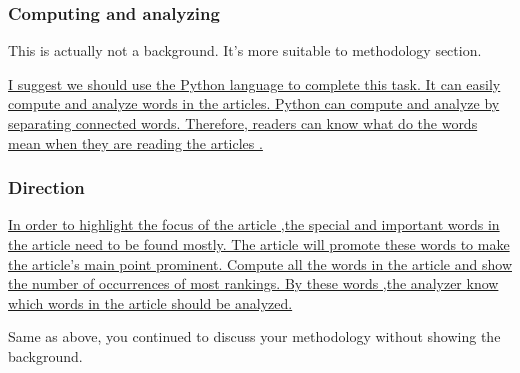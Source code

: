 \subsubsection*{Computing and analyzing}
This is actually not a background. It's more suitable to methodology section.

\ul{I suggest we should use the Python language to complete this task. It can easily compute and analyze words in the articles. Python can compute and analyze by separating connected words. Therefore, readers can know what do the words mean when they are reading the articles .}

\subsubsection*{Direction}
\ul{In order to highlight the focus of the article ,the special and important words in the article need to be found mostly. The article will promote these words to make the article's main point prominent. Compute all the words in the article and show the number of occurrences of most rankings. By these words ,the analyzer know which words in the article should be analyzed.}


Same as above, you continued to discuss your methodology without showing the background. 
